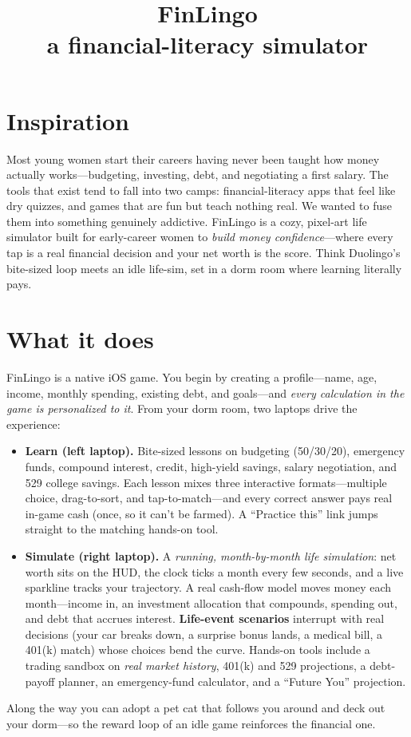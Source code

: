 \documentclass[11pt]{article}
\title{\vspace{-1.5em}\textbf{FinLingo}\\[-0.2em]{\large\normalfont a financial-literacy simulator}}
\author{}
\date{}
\begin{document}
\maketitle
\vspace{-2.5em}

\section*{Inspiration}
Most young women start their careers having never been taught how money actually
works---budgeting, investing, debt, and negotiating a first salary. The tools that
exist tend to fall into two camps: financial-literacy apps that feel like dry quizzes,
and games that are fun but teach nothing real. We wanted to fuse them into something
genuinely addictive. FinLingo is a cozy, pixel-art life simulator built for
early-career women to \emph{build money confidence}---where every tap is a real
financial decision and your net worth is the score. Think Duolingo's bite-sized
loop meets an idle life-sim, set in a dorm room where learning literally pays.

\section*{What it does}
FinLingo is a native iOS game. You begin by creating a profile---name, age, income,
monthly spending, existing debt, and goals---and \emph{every calculation in the game is
personalized to it}. From your dorm room, two laptops drive the experience:
\begin{itemize}
  \item \textbf{Learn (left laptop).} Bite-sized lessons on budgeting (50/30/20),
  emergency funds, compound interest, credit, high-yield savings, salary negotiation,
  and 529 college savings. Each lesson mixes three interactive formats---multiple
  choice, drag-to-sort, and tap-to-match---and every correct answer pays real in-game
  cash (once, so it can't be farmed). A ``Practice this'' link jumps straight to the
  matching hands-on tool.
  \item \textbf{Simulate (right laptop).} A \emph{running, month-by-month life
  simulation}: net worth sits on the HUD, the clock ticks a month every few seconds,
  and a live sparkline tracks your trajectory. A real cash-flow model moves money each
  month---income in, an investment allocation that compounds, spending out, and debt
  that accrues interest. \textbf{Life-event scenarios} interrupt with real decisions
  (your car breaks down, a surprise bonus lands, a medical bill, a 401(k) match) whose
  choices bend the curve. Hands-on tools include a trading sandbox on \emph{real market
  history}, 401(k) and 529 projections, a debt-payoff planner, an emergency-fund
  calculator, and a ``Future You'' projection.
\end{itemize}
Along the way you can adopt a pet cat that follows you around and deck out your dorm---so
the reward loop of an idle game reinforces the financial one.
\end{document}
